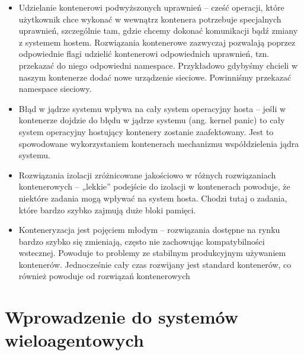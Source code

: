 \documentclass[10pt,a4paper,titlepage,twoside]{report}
\begin{document}
\begin{itemize}
	\item Udzielanie kontenerowi podwyższonych uprawnień – cześć operacji, które użytkownik chce wykonać w wewnątrz kontenera potrzebuje specjalnych uprawnień, szczególnie tam, gdzie chcemy dokonać komunikacji bądź zmiany z systemem hostem. Rozwiązania kontenerowe zazwyczaj pozwalają poprzez odpowiednie flagi udzielić kontenerowi odpowiednich uprawnień, tzn. przekazać do niego odpowiedni namespace. Przykładowo gdybyśmy chcieli w naszym kontenerze dodać nowe urządzenie sieciowe. Powinniśmy przekazać namespace sieciowy.
	\item Błąd w jądrze systemu wpływa na cały system operacyjny hosta – jeśli w kontenerze dojdzie do błędu w jądrze systemu (ang. kernel panic) to cały system operacyjny hostujący kontenery zostanie zaafektowany. Jest to spowodowane wykorzystaniem kontenerach mechanizmu współdzielenia jądra systemu.
	\item Rozwiązania izolacji zróżnicowane jakościowo w różnych rozwiązaniach kontenerowych – „lekkie” podejście do izolacji w kontenerach powoduje, że niektóre zadania mogą wpływać na system hosta. Chodzi tutaj o zadania, które bardzo szybko zajmują duże bloki pamięci.
	\item Konteneryzacja jest pojęciem młodym – rozwiązania dostępne na rynku bardzo szybko się zmieniają, często nie zachowując kompatybilności wstecznej. Powoduje to problemy ze stabilnym produkcyjnym używaniem kontenerów. Jednocześnie cały czas rozwijany jest standard kontenerów, co również powoduje od rozwiązań kontenerowych 
\end{itemize}

\newpage

\chapter{Wprowadzenie do systemów wieloagentowych}


\listoffigures
{}

\newpage

\listoftables
{}
\end{document}
